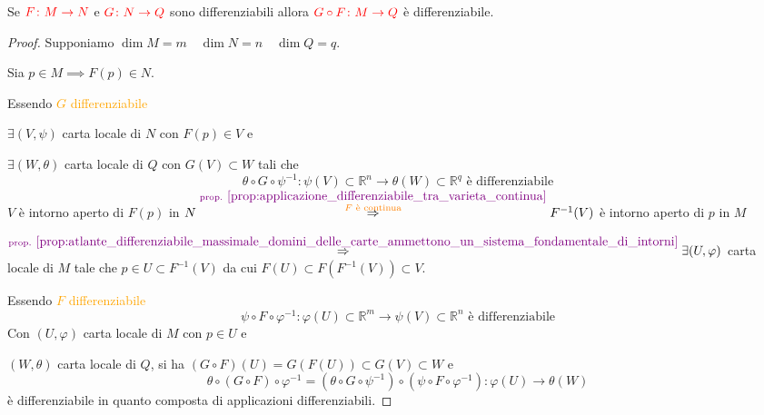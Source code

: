         \begin{proposizione}
        \label{prop:composizione_di_app_diff_tra_varietà_diff}
        \mbox{}

        Se $\textcolor{red}{F \colon M \to N}$ e $\textcolor{red}{G \colon N \to Q}$ sono differenziabili allora $\textcolor{red}{G \circ F \colon M \to Q}$ è differenziabile.
        \end{proposizione}

        \begin{proof}
        \mbox{}

        Supponiamo $\dim M = m \quad \dim N = n \quad \dim Q = q$. 
        
        Sia $p \in M \implies F(p) \in N$. 
        
        Essendo \textcolor{orange}{$G$ differenziabile} 
        
        $\exists (V, \psi)$ carta locale di $N$ con $F(p) \in V$ e 
        
        $\exists (W, \theta)$ carta locale di $Q$ con $G(V) \subset W$ tali che
        \[
        \theta \circ G \circ \psi^{-1} \colon \psi(V) \subset \mathbb{R}^n \to \theta(W) \subset \mathbb{R}^q \text{ è differenziabile}
        \]
        $V$ è intorno aperto di $F(p)$ in $N \overset{\textcolor{violet}{\substack{\text{prop. } \ref{prop:applicazione_differenziabile_tra_varieta_continua} \\ \text{\textcolor{orange}{$F$ è continua}}}}}{\Rightarrow} F^{-1}(V)$ è intorno aperto di $p$ in $M$

        $\overset{\textcolor{violet}{\substack{\text{prop. } \ref{prop:atlante_differenziabile_massimale_domini_delle_carte_ammettono_un_sistema_fondamentale_di_intorni}}}}{\Rightarrow} \exists (U, \varphi)$ carta locale di $M$ tale che $p \in U \subset F^{-1}(V)$ da cui $F(U) \subset F(F^{-1}(V)) \subset V$. 
        
        Essendo \textcolor{orange}{$F$ differenziabile}
        \[
        \psi \circ F \circ \varphi^{-1} \colon \varphi(U) \subset \mathbb{R}^m \to \psi(V) \subset \mathbb{R}^n \text{ è differenziabile}
        \]
        Con $(U, \varphi)$ carta locale di $M$ con $p \in U$ e 
        
        $(W, \theta)$ carta locale di $Q$, si ha $(G \circ F)(U) = G(F(U)) \subset G(V) \subset W$ e
        \[
        \theta \circ (G \circ F) \circ \varphi^{-1} = (\theta \circ G \circ \psi^{-1}) \circ (\psi \circ F \circ \varphi^{-1}) \colon \varphi(U) \to \theta(W)
        \]
        è differenziabile in quanto composta di applicazioni differenziabili.
        \end{proof}
